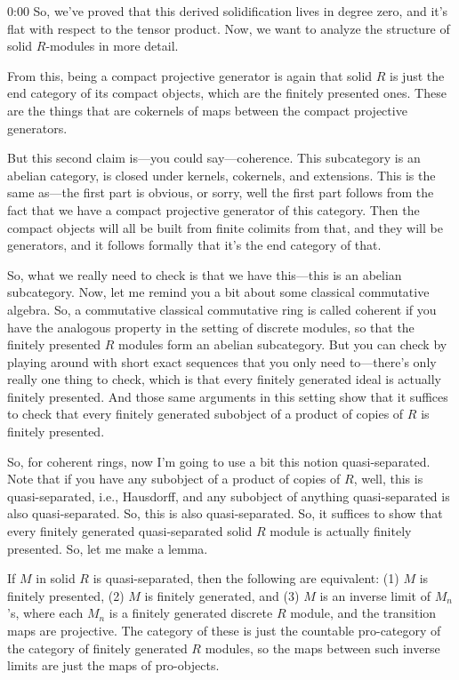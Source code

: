 \begin{unfinished}{0:00}
So, we've proved that this derived solidification lives in degree zero, and it's flat with respect to the tensor product. Now, we want to analyze the structure of solid $R$-modules in more detail.

From this, being a compact projective generator is again that solid $R$ is just the end category of its compact objects, which are the finitely presented ones. These are the things that are cokernels of maps between the compact projective generators.

But this second claim is---you could say---coherence. This subcategory is an abelian category, is closed under kernels, cokernels, and extensions. This is the same as---the first part is obvious, or sorry, well the first part follows from the fact that we have a compact projective generator of this category. Then the compact objects will all be built from finite colimits from that, and they will be generators, and it follows formally that it's the end category of that.

So, what we really need to check is that we have this---this is an abelian subcategory. Now, let me remind you a bit about some classical commutative algebra. So, a commutative classical commutative ring is called coherent if you have the analogous property in the setting of discrete modules, so that the finitely presented $R$ modules form an abelian subcategory. But you can check by playing around with short exact sequences that you only need to---there's only really one thing to check, which is that every finitely generated ideal is actually finitely presented. And those same arguments in this setting show that it suffices to check that every finitely generated subobject of a product of copies of $R$ is finitely presented.

So, for coherent rings, now I'm going to use a bit this notion quasi-separated. Note that if you have any subobject of a product of copies of $R$, well, this is quasi-separated, i.e., Hausdorff, and any subobject of anything quasi-separated is also quasi-separated. So, this is also quasi-separated. So, it suffices to show that every finitely generated quasi-separated solid $R$ module is actually finitely presented. So, let me make a lemma.

If $M$ in solid $R$ is quasi-separated, then the following are equivalent: (1) $M$ is finitely presented, (2) $M$ is finitely generated, and (3) $M$ is an inverse limit of $M_n$'s, where each $M_n$ is a finitely generated discrete $R$ module, and the transition maps are projective. The category of these is just the countable pro-category of the category of finitely generated $R$ modules, so the maps between such inverse limits are just the maps of pro-objects.


\end{unfinished}
